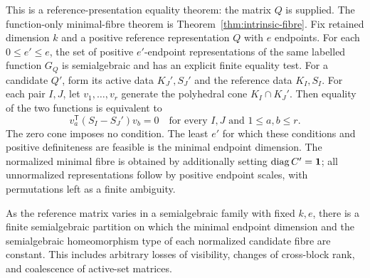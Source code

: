 \begin{theorem}\label{thm:all-strata}
This is a reference-presentation equality theorem: the matrix $Q$ is supplied. The function-only minimal-fibre theorem is Theorem~\ref{thm:intrinsic-fibre}.
Fix retained dimension $k$ and a positive reference representation $Q$ with $e$ endpoints. For each $0\le e'\le e$, the set of positive $e'$-endpoint representations of the same labelled function $G_Q$ is semialgebraic and has an explicit finite equality test. For a candidate $Q'$, form its active data $K_J',S_J'$ and the reference data $K_I,S_I$. For each pair $I,J$, let $v_1,\ldots,v_r$ generate the polyhedral cone $K_I\cap K_J'$. Then equality of the two functions is equivalent to
\begin{equation}\label{eq:all-strata-test}
 v_a^{\mathsf T}(S_I-S_J')v_b=0
 \quad\text{for every }I,J\text{ and }1\le a,b\le r.
\end{equation}
The zero cone imposes no condition. The least $e'$ for which these conditions and positive definiteness are feasible is the minimal endpoint dimension. The normalized minimal fibre is obtained by additionally setting $\operatorname{diag} C'=\mathbf1$; all unnormalized representations follow by positive endpoint scales, with permutations left as a finite ambiguity.

As the reference matrix varies in a semialgebraic family with fixed $k,e$, there is a finite semialgebraic partition on which the minimal endpoint dimension and the semialgebraic homeomorphism type of each normalized candidate fibre are constant. This includes arbitrary losses of visibility, changes of cross-block rank, and coalescence of active-set matrices.
\end{theorem}
